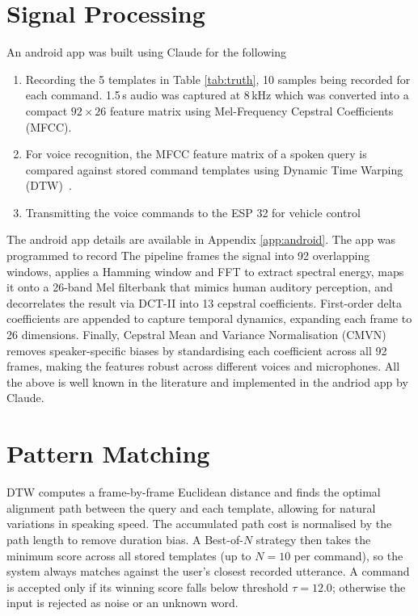 \documentclass[conference]{IEEEtran}
\begin{document}
	\section{Signal Processing} \label{sec:mfcc}
An android app was built using Claude for the following
\begin{enumerate}
	\item Recording the 5 templates in Table \ref{tab:truth}, 10 samples being recorded for each command. 1.5\,s audio was captured at 8\,kHz which was converted into a compact
$92 \times 26$ feature matrix using Mel-Frequency Cepstral Coefficients (MFCC).
	\item For voice recognition, 
the MFCC feature matrix of a spoken query is compared against stored
command templates using Dynamic Time Warping (DTW)~\cite{sakoe1978dtw}.
	\item Transmitting the voice commands to the ESP 32 for vehicle control
\end{enumerate}
	The android app details are available in Appendix 
\ref{app:android}.
\iffalse
The app was programmed to record The pipeline frames the signal into 92 overlapping windows, applies a Hamming
window and FFT to extract spectral energy, maps it onto a 26-band Mel filterbank
that mimics human auditory perception, and decorrelates the result via DCT-II
into 13 cepstral coefficients. First-order delta coefficients are appended to
capture temporal dynamics, expanding each frame to 26 dimensions. Finally,
Cepstral Mean and Variance Normalisation (CMVN)~\cite{furui1981cmvn} removes
speaker-specific biases by standardising each coefficient across all 92 frames,
making the features robust across different voices and microphones.  All the above is well known in the literature and implemented in the andriod app by Claude.
\section{Pattern Matching} \label{sec:dtw}

DTW computes a frame-by-frame Euclidean distance and finds the optimal
alignment path between the query and each template, allowing for natural
variations in speaking speed. The accumulated path cost is normalised by
the path length to remove duration bias. A Best-of-$N$ strategy then
takes the minimum score across all stored templates (up to $N=10$ per
command), so the system always matches against the user's closest recorded
utterance. A command is accepted only if its winning score falls below
threshold $\tau = 12.0$; otherwise the input is rejected as noise or an
unknown word.
	
\end{document}
